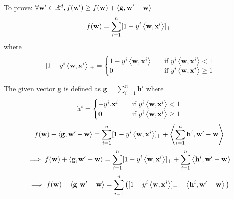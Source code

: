 \documentclass[a4paper,11pt]{article}
\begin{document}
\begin{mlsolution}

\end{mlsolution}

\begin{mlsolution}
To prove: $\forall \mathbf{w'} \in \mathbb{R}^d, f(\mathbf{w'}) \geq f(\mathbf{w}) + \left\langle{\mathbf{g}},{\mathbf{w'-w}}\right\rangle$
\[
	f(\mathbf{w}) = \sum_{i=1}^{n}[1 - y^i \left\langle{\mathbf{w}},{\mathbf{x}^i}\right\rangle]_{+}
\]
where
\[
	[1 - y^i \left\langle{\mathbf{w}},{\mathbf{x}^i}\right\rangle]_{+} = 
     \begin{cases}
       1 - y^i \left\langle{\mathbf{w}},{\mathbf{x}^i}\right\rangle &\quad\text{if }y^i \left\langle{\mathbf{w}},{\mathbf{x}^i}\right\rangle < 1\\
       0 &\quad\text{if }y^i \left\langle{\mathbf{w}},{\mathbf{x}^i}\right\rangle \geq 1\\
     \end{cases}
\]

The given vector $\mathbf{g}$ is defined as $\mathbf{g} = \sum_{i=1}^{n}\mathbf{h}^i$ where 
\[
	\mathbf{h}^i = 
     \begin{cases}
      -y^i . \mathbf{x}^i  &\quad\text{if }y^i \left\langle{\mathbf{w}},{\mathbf{x}^i}\right\rangle < 1\\
       \mathbf{0}                          &\quad\text{if }y^i \left\langle{\mathbf{w}},{\mathbf{x}^i}\right\rangle \geq 1\\
     \end{cases}
\]
\[ f(\mathbf{w}) + \left\langle{\mathbf{g}},{\mathbf{w'-w}}\right\rangle = \sum_{i=1}^{n}[1 - y^i \left\langle{\mathbf{w}},{\mathbf{x}^i}\right\rangle]_{+} + \left\langle{\sum_{i=1}^{n}\mathbf{h}^i},{\mathbf{w'-w}}\right\rangle \]
\[ \implies f(\mathbf{w}) + \left\langle{\mathbf{g}},{\mathbf{w'-w}}\right\rangle = \sum_{i=1}^{n}[1 - y^i \left\langle{\mathbf{w}},{\mathbf{x}^i}\right\rangle]_{+} + \sum_{i=1}^{n}\left\langle{\mathbf{h}^i},{\mathbf{w'-w}}\right\rangle \]
\[ \implies f(\mathbf{w}) + \left\langle{\mathbf{g}},{\mathbf{w'-w}}\right\rangle = \sum_{i=1}^{n}\big([1 - y^i \left\langle{\mathbf{w}},{\mathbf{x}^i}\right\rangle]_{+} +\left\langle{\mathbf{h}^i},{\mathbf{w'-w}}\right\rangle\big) \]


\end{mlsolution}
\end{document}
